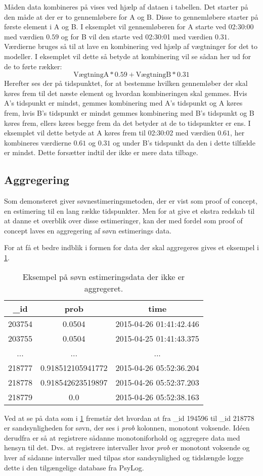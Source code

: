 Måden data kombineres på vises ved hjælp af dataen i tabellen.
Det starter på den måde at der er to gennemløbere for A og B. 
Disse to gennemløbere starter på første element i A og B. 
I eksemplet vil gennemløberen for A starte ved 02:30:00 med værdien $0.59$ og for B vil den starte ved 02:30:01 med værdien $0.31$.
Værdierne bruges så til at lave en kombinering ved hjælp af vægtninger for det to modeller. I eksemplet vil dette så betyde at kombinering vil se sådan her ud for de to førte rækker: $$\text{VægtningA} * 0.59 + \text{VægtningB} * 0.31$$
Herefter ses der på tidspunktet, for at bestemme hvilken gennemløber der skal køres frem til det næste element og hvordan kombineringen skal gemmes.
Hvis A's tidspunkt er mindst, gemmes kombinering med A's tidspunkt og A køres frem, hvis B's tidspunkt er mindst gemmes kombinering med B's tidspunkt og B køres frem, ellers køres begge frem da det betyder at de to tidspunkter er ens.
I eksemplet vil dette betyde at A køres frem til 02:30:02 med værdien $0.61$, her kombineres værdierne $0.61$ og $0.31$ og under B's tidspunkt da den i dette tilfælde er mindst.
Dette forsætter indtil der ikke er mere data tilbage.

\subsection{Aggregering}\label{subsec:soevnaggre}
Som demonsteret giver søvnestimeringsmetoden, der er vist som proof of concept, en estimering til en lang række tidspunkter.
Men for at give et ekstra redskab til at danne et overblik over disse estimeringer, kan der med fordel som proof of concept laves en aggregering af søvn estimerings data.

For at få et bedre indblik i formen for data der skal aggregeres gives et eksempel i \cref{tab:noaggsoevndata}.
\begin{table}[h]
	\centering
\begin{tabular}{|c|c|c|}
	\hline {\_}id & prob & time \\ 
	\hline 203754 & 0.0504 & 2015-04-26 01:41:42.446 \\ 
	\hline 203755 & 0.0504 & 2015-04-25 01:41:43.375 \\ 
	\hline ... & ... & ... \\ 
	\hline 218777 & 0.918512105941772 & 2015-04-26 05:52:36.204 \\ 
	\hline 218778 & 0.918542623519897 & 2015-04-26 05:52:37.203 \\ 
	\hline 218779 & 0.0 & 2015-04-26 05:52:38.163 \\ 
	\hline 
\end{tabular}
\caption{Eksempel på søvn estimeringsdata der ikke er aggregeret.}\label{tab:noaggsoevndata}
\end{table}
Ved at se på data som i \cref{tab:noaggsoevndata} fremstår det hvordan at fra {\_}id 194596 til {\_}id 218778 er sandsynligheden for søvn, der ses i \textit{prob} kolonnen, monotont voksende.
Idéen derudfra er så at registrere sådanne monotoniforhold og aggregere data med hensyn til det.
Dvs. at registrere intervaller hvor \textit{prob} er monotont voksende og hver af sådanne intervaller med tilpas stor sandsynlighed og tidslængde logge dette i den tilgængelige database fra PsyLog.

